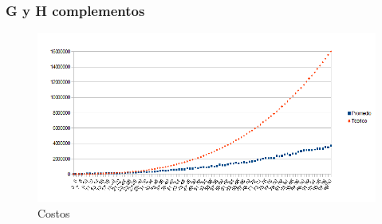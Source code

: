 \subsubsection{G y H complementos}

\begin{figure}[H]
	\centering
	\includegraphics[scale=0.5]{goloso tiempos H complemento.png}
\caption{Costos}
\end{figure}